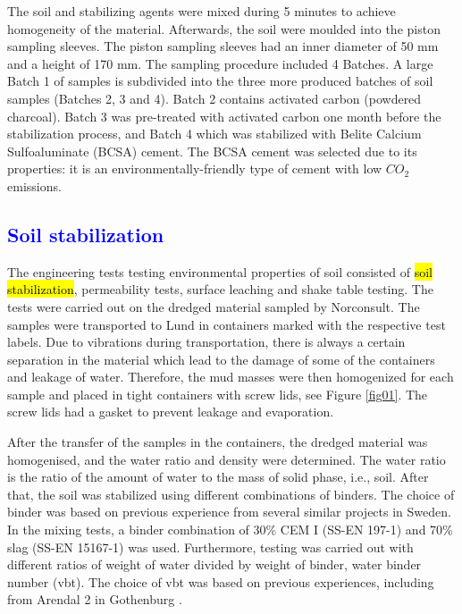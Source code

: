 \documentclass[algorithms,article,submit,pdftex,moreauthors]{Definitions/mdpi}
\begin{document}
The soil and stabilizing agents were mixed during 5 minutes to achieve homogeneity of the material. Afterwards, the soil were moulded into the piston sampling sleeves. The piston sampling sleeves had an inner diameter of 50 mm and a height of 170 mm. The sampling procedure included 4 Batches. A large Batch 1 of samples is subdivided into the three more produced batches of soil samples (Batches 2, 3 and 4). Batch 2 contains activated carbon (powdered charcoal). Batch 3 was pre-treated with activated carbon one month before the stabilization process, and Batch 4 which was stabilized with Belite Calcium Sulfoaluminate (BCSA) cement. The BCSA cement was selected due to its properties: it is an environmentally-friendly type of cement with low $CO_2$ emissions.

\subsection{\textcolor{blue}{Soil stabilization}}

The engineering tests testing environmental properties of soil consisted of \hl{soil stabilization}, permeability tests, surface leaching and shake table testing. The tests were carried out on the dredged material sampled by Norconsult. The samples were transported to Lund in containers marked with the respective test labels. Due to vibrations during transportation, there is always a certain separation in the material which lead to the damage of some of the containers and leakage of water. Therefore, the mud masses were then homogenized for each sample and placed in tight containers with screw lids, see Figure \ref{fig01}. The screw lids had a gasket to prevent leakage and evaporation.

After the transfer of the samples in the containers, the dredged material was homogenised, and the water ratio and density were determined. The water ratio is the ratio of the amount of water to the mass of solid phase, i.e., soil. After that, the soil was stabilized using different combinations of binders. The choice of binder was based on previous experience from several similar projects in Sweden. In the mixing tests, a binder combination of 30\% CEM I (SS-EN 197-1) \cite{SIS2011} and 70\% slag (SS-EN 15167-1) \cite{SIS2006} was used. Furthermore, testing was carried out with different ratios of weight of water divided by weight of binder, water binder number (vbt). The choice of vbt was based on previous experiences, including from Arendal 2 in Gothenburg \cite{Lindh202139}.
\end{document}
